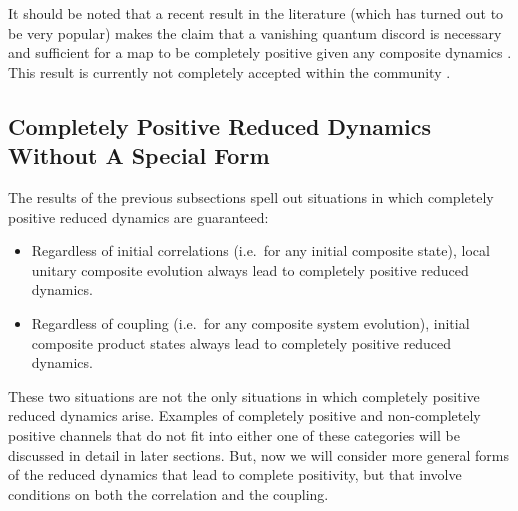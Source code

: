 It should be noted that a recent result in the literature (which has turned out to be very popular) makes the claim that a vanishing quantum discord is necessary and sufficient for a map to be completely positive given any composite dynamics \cite{Lidar2009a}.  This result is currently not completely accepted within the community \cite{Cesar2013,Simon2013}.

\subsection{Completely Positive Reduced Dynamics Without A Special Form}
The results of the previous subsections spell out situations in which completely positive reduced dynamics are guaranteed:
\begin{itemize}
\item Regardless of initial correlations (i.e.\ for any initial composite state), local unitary composite evolution always lead to completely positive reduced dynamics.
\item Regardless of coupling (i.e.\ for any composite system evolution), initial composite product states always lead to completely positive reduced dynamics.
\end{itemize}
These two situations are not the only situations in which completely positive reduced dynamics arise.  Examples of completely positive and non-completely positive channels that do not fit into either one of these categories will be discussed in detail in later sections.  But, now we will consider more general forms of the reduced dynamics that lead to complete positivity, but that involve conditions on both the correlation and the coupling.

